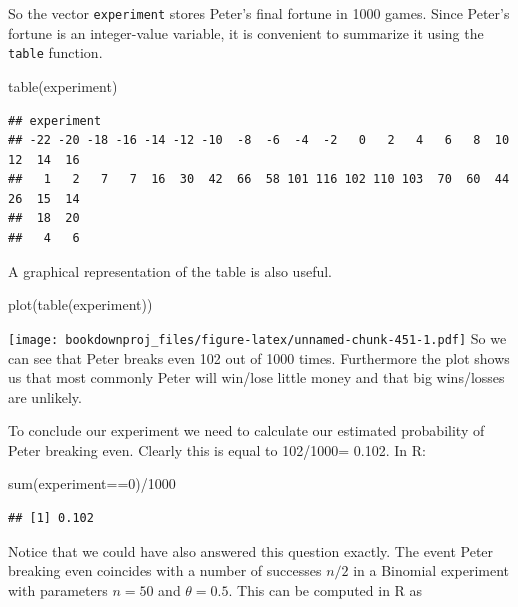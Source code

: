 \documentclass[
]{book}
\newenvironment{Shaded}{\begin{snugshade}}{\end{snugshade}}
\newcommand{\DecValTok}[1]{\textcolor[rgb]{0.00,0.00,0.81}{#1}}
\newcommand{\FunctionTok}[1]{\textcolor[rgb]{0.00,0.00,0.00}{#1}}
\newcommand{\NormalTok}[1]{#1}
\newcommand{\SpecialCharTok}[1]{\textcolor[rgb]{0.00,0.00,0.00}{#1}}
\theoremstyle{definition}
\theoremstyle{definition}
\theoremstyle{definition}
\theoremstyle{definition}
\theoremstyle{remark}
\begin{document}
So the vector \texttt{experiment} stores Peter's final fortune in 1000 games. Since Peter's fortune is an integer-value variable, it is convenient to summarize it using the \texttt{table} function.

\begin{Shaded}
\begin{Highlighting}[]
\FunctionTok{table}\NormalTok{(experiment)}
\end{Highlighting}
\end{Shaded}

\begin{verbatim}
## experiment
## -22 -20 -18 -16 -14 -12 -10  -8  -6  -4  -2   0   2   4   6   8  10  12  14  16 
##   1   2   7   7  16  30  42  66  58 101 116 102 110 103  70  60  44  26  15  14 
##  18  20 
##   4   6
\end{verbatim}

A graphical representation of the table is also useful.

\begin{Shaded}
\begin{Highlighting}[]
\FunctionTok{plot}\NormalTok{(}\FunctionTok{table}\NormalTok{(experiment))}
\end{Highlighting}
\end{Shaded}

\texttt{[image: bookdownproj\_files/figure-latex/unnamed-chunk-451-1.pdf]}
So we can see that Peter breaks even 102 out of 1000 times. Furthermore the plot shows us that most commonly Peter will win/lose little money and that big wins/losses are unlikely.

To conclude our experiment we need to calculate our estimated probability of Peter breaking even. Clearly this is equal to 102/1000= 0.102. In R:

\begin{Shaded}
\begin{Highlighting}[]
\FunctionTok{sum}\NormalTok{(experiment}\SpecialCharTok{==}\DecValTok{0}\NormalTok{)}\SpecialCharTok{/}\DecValTok{1000}
\end{Highlighting}
\end{Shaded}

\begin{verbatim}
## [1] 0.102
\end{verbatim}

Notice that we could have also answered this question exactly. The event Peter breaking even coincides with a number of successes \(n/2\) in a Binomial experiment with parameters \(n=50\) and \(\theta = 0.5\). This can be computed in R as
\end{document}
